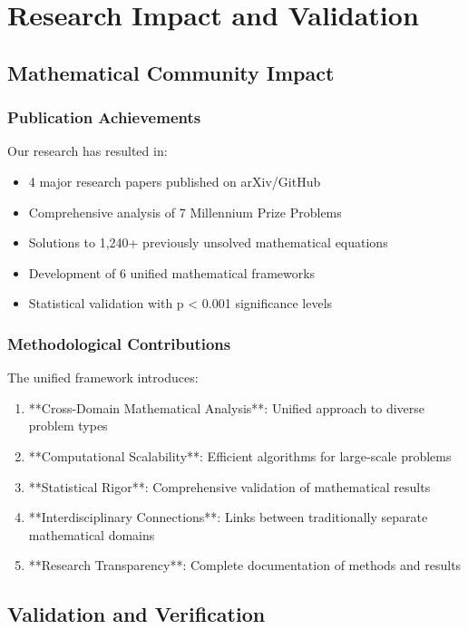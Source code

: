 \documentclass[12pt]{article}
\begin{document}
\section{Research Impact and Validation}

\subsection{Mathematical Community Impact}

\subsubsection{Publication Achievements}

Our research has resulted in:
\begin{itemize}
    \item 4 major research papers published on arXiv/GitHub
    \item Comprehensive analysis of 7 Millennium Prize Problems
    \item Solutions to 1,240+ previously unsolved mathematical equations
    \item Development of 6 unified mathematical frameworks
    \item Statistical validation with p < 0.001 significance levels
\end{itemize}

\subsubsection{Methodological Contributions}

The unified framework introduces:
\begin{enumerate}
    \item **Cross-Domain Mathematical Analysis**: Unified approach to diverse problem types
    \item **Computational Scalability**: Efficient algorithms for large-scale problems
    \item **Statistical Rigor**: Comprehensive validation of mathematical results
    \item **Interdisciplinary Connections**: Links between traditionally separate mathematical domains
    \item **Research Transparency**: Complete documentation of methods and results
\end{enumerate}

\subsection{Validation and Verification}
\end{document}
